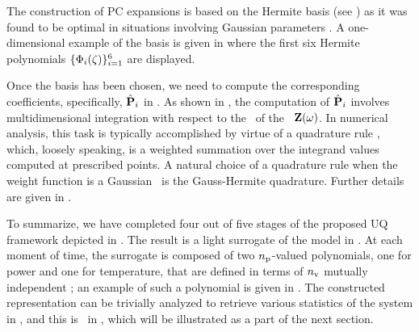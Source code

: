 The construction of PC expansions is based on the Hermite basis (see ) as it was found to be optimal in situations involving Gaussian parameters \cite{xiu2010}. A one-dimensional example of the basis is given in  where the first six Hermite polynomials $\{ \Phi_i(\zeta) \}_{i = 1}^6$ are displayed.

Once the basis has been chosen, we need to compute the corresponding coefficients, specifically, $\hat{\mathbf{P}}_i$ in . As shown in , the computation of $\hat{\mathbf{P}}_i$ involves multidimensional integration with respect to the \pdf\ of the \rvs\ $\mathbf{Z}(\omega)$. In numerical analysis, this task is typically accomplished by virtue of a quadrature rule \cite{press2007}, which, loosely speaking, is a weighted summation over the integrand values computed at prescribed points. A natural choice of a quadrature rule when the weight function is a Gaussian \pdf\ is the Gauss-Hermite quadrature. Further details are given in .

To summarize, we have completed four out of five stages of the proposed UQ framework depicted in . The result is a light surrogate of the model in . At each moment of time, the surrogate is composed of two ${n_\text{p}}$-valued polynomials, one for power and one for temperature, that are defined in terms of ${n_\text{v}}$ mutually independent \rvs; an example of such a polynomial is given in . The constructed representation can be trivially analyzed to retrieve various statistics of the system in , and this is \ in , which will be illustrated as a part of the next section.
